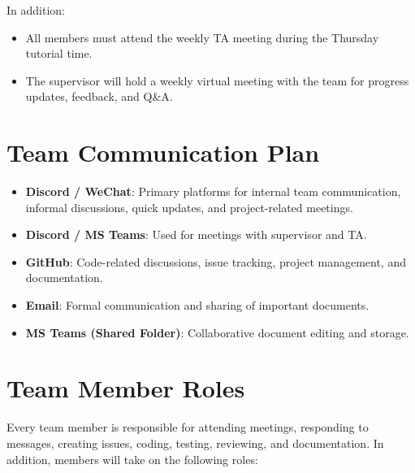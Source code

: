 \documentclass{article}
\begin{document}
In addition:
\begin{itemize}
    \item All members must attend the weekly TA meeting during the Thursday tutorial time.
    \item The supervisor will hold a weekly virtual meeting with the team for progress updates, feedback, and Q\&A.
\end{itemize}





\section{Team Communication Plan}

\begin{itemize}
  \item \textbf{Discord / WeChat}: Primary platforms for internal team communication, informal discussions, quick updates, and project-related meetings.
  \item \textbf{Discord / MS Teams}: Used for meetings with supervisor and TA.
  \item \textbf{GitHub}: Code-related discussions, issue tracking, project management, and documentation.
  \item \textbf{Email}: Formal communication and sharing of important documents.
  \item \textbf{MS Teams (Shared Folder)}: Collaborative document editing and storage.
\end{itemize}


\section{Team Member Roles}


Every team member is responsible for attending meetings, responding to messages, creating issues, coding, testing, 
reviewing, and documentation. In addition, members will take on the following roles:
\end{document}
